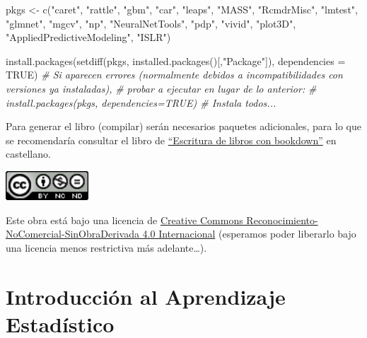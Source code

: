 \documentclass[
  spanish,
]{book}
\newenvironment{Shaded}{\begin{snugshade}}{\end{snugshade}}
\newcommand{\AttributeTok}[1]{\textcolor[rgb]{0.77,0.63,0.00}{#1}}
\newcommand{\CommentTok}[1]{\textcolor[rgb]{0.56,0.35,0.01}{\textit{#1}}}
\newcommand{\ConstantTok}[1]{\textcolor[rgb]{0.00,0.00,0.00}{#1}}
\newcommand{\FunctionTok}[1]{\textcolor[rgb]{0.00,0.00,0.00}{#1}}
\newcommand{\NormalTok}[1]{#1}
\newcommand{\OtherTok}[1]{\textcolor[rgb]{0.56,0.35,0.01}{#1}}
\newcommand{\StringTok}[1]{\textcolor[rgb]{0.31,0.60,0.02}{#1}}
\theoremstyle{break}
\theoremstyle{definition}
\theoremstyle{definition}
\theoremstyle{definition}
\theoremstyle{definition}
\theoremstyle{remark}
\begin{document}
\begin{Shaded}
\begin{Highlighting}[]
\NormalTok{pkgs }\OtherTok{\textless{}{-}} \FunctionTok{c}\NormalTok{(}\StringTok{"caret"}\NormalTok{, }\StringTok{"rattle"}\NormalTok{, }\StringTok{"gbm"}\NormalTok{, }\StringTok{"car"}\NormalTok{, }\StringTok{"leaps"}\NormalTok{, }\StringTok{"MASS"}\NormalTok{, }\StringTok{"RcmdrMisc"}\NormalTok{, }
          \StringTok{"lmtest"}\NormalTok{, }\StringTok{"glmnet"}\NormalTok{, }\StringTok{"mgcv"}\NormalTok{, }\StringTok{"np"}\NormalTok{, }\StringTok{"NeuralNetTools"}\NormalTok{, }\StringTok{"pdp"}\NormalTok{, }\StringTok{"vivid"}\NormalTok{,}
          \StringTok{"plot3D"}\NormalTok{, }\StringTok{"AppliedPredictiveModeling"}\NormalTok{, }\StringTok{"ISLR"}\NormalTok{)}

\FunctionTok{install.packages}\NormalTok{(}\FunctionTok{setdiff}\NormalTok{(pkgs, }\FunctionTok{installed.packages}\NormalTok{()[,}\StringTok{"Package"}\NormalTok{]), }\AttributeTok{dependencies =} \ConstantTok{TRUE}\NormalTok{)}
\CommentTok{\# Si aparecen errores (normalmente debidos a incompatibilidades con versiones ya instaladas), }
\CommentTok{\# probar a ejecutar en lugar de lo anterior:}
\CommentTok{\# install.packages(pkgs, dependencies=TRUE) \# Instala todos...}
\end{Highlighting}
\end{Shaded}

Para generar el libro (compilar) serán necesarios paquetes adicionales,
para lo que se recomendaría consultar el libro de \href{https://rubenfcasal.github.io/bookdown_intro}{``Escritura de libros con bookdown''} en castellano.

\includegraphics[width=1.22in]{images/by-nc-nd-88x31}

Este obra está bajo una licencia de \href{https://creativecommons.org/licenses/by-nc-nd/4.0/deed.es_ES}{Creative Commons Reconocimiento-NoComercial-SinObraDerivada 4.0 Internacional}
(esperamos poder liberarlo bajo una licencia menos restrictiva más adelante\ldots).

\hypertarget{intro-AE}{%
\chapter{Introducción al Aprendizaje Estadístico}\label{intro-AE}}
\end{document}
